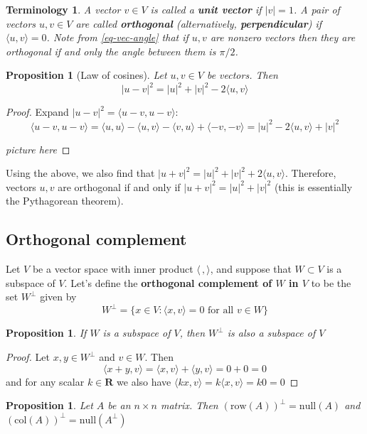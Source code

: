 \documentclass[12pt]{article}
\numberwithin{equation}{subsection}
\numberwithin{figure}{subsection}
\newtheorem{prop}[subsection]{Proposition}
\theoremstyle{note}
\newtheorem{terminology}[subsection]{Terminology}
\newcommand{\R}{\mathbf{R}}
\newcommand\nul[1]{\mathrm{null}(#1)}
\newcommand\col[1]{\mathrm{col}(#1)}
\newcommand\row[1]{\mathrm{row}(#1)}
\newcommand\ip[2]{\langle #1, #2\rangle}
\begin{document}
\begin{terminology}
	A vector $v\in V$ is called a \textbf{unit vector} if $|v|=1$. A pair of vectors $u,v\in V$ are called \textbf{orthogonal} (alternatively, \textbf{perpendicular}) if $\ip{u}{v}=0$. Note from \eqref{eq-vec-angle} that if $u,v$ are \textit{nonzero} vectors then they are orthogonal if and only the angle between them is $\pi/2$.
\end{terminology}

\begin{prop}[Law of cosines]
	Let $u,v\in V$ be vectors. Then \begin{equation} 
		|u-v|^2=|u|^2+|v|^2-2\ip{u}{v} 
	\end{equation}
\end{prop}
\begin{proof}
Expand $|u-v|^2=\ip{u-v}{u-v}$: \[ \ip{u-v}{u-v}=\ip{u}{u}-\ip{u}{v}-\ip{v}{u}+\ip{-v}{-v}=|u|^2 -2\ip{u}{v}+|v|^2\]

\textit{picture here}
\end{proof}

Using the above, we also find that $|u+v|^2=|u|^2+|v|^2+2\ip{u}{v}$. Therefore, vectors $u,v$ are orthogonal if and only if $|u+v|^2=|u|^2+|v|^2$ (this is essentially the Pythagorean theorem). 


\subsection{Orthogonal complement} 

Let $V$ be a vector space with inner product $\ip{\,}{}$, and suppose that $W\subset V$ is a subspace of $V$. Let's define the \textbf{orthogonal complement of $W$ in $V$} to be the set $W^{\perp}$ given by \begin{equation} W^{\perp} =\{ x\in V : \ip{x}{v}=0 \text{ for all $v\in W$}\} \end{equation}
\begin{prop}
	 If $W$ is a subspace of $V$, then $W^{\perp}$ is also a subspace of $V$
\end{prop}
\begin{proof}
	Let $x,y\in W^{\perp}$ and $v\in W$. Then \[ \ip{x+y}{v}=\ip{x}{v}+\ip{y}{v}=0+0=0\] and for any scalar $k\in\R$ we also have $\ip{kx}{v}=k\ip{x}{v}=k0=0$
\end{proof}


\begin{prop}
	Let $A$ be an $n\times n$ matrix. Then $(\row A)^{\perp}=\nul A$ and $(\col A)^{\perp}=\nul{A^{\perp}}$
\end{prop}
\end{document}
